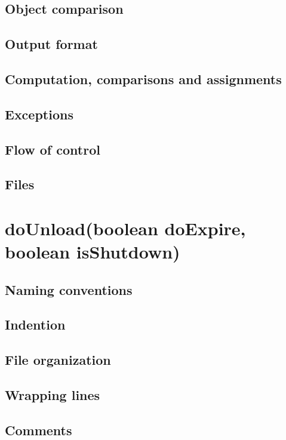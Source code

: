 \subsection*{Object comparison}

\subsection*{Output format}

\subsection*{Computation, comparisons and assignments}

\subsection*{Exceptions}

\subsection*{Flow of control}

\subsection*{Files}

\section*{doUnload(boolean doExpire, boolean isShutdown)}

\subsection*{Naming conventions}

\subsection*{Indention}

\subsection*{File organization}

\subsection*{Wrapping lines}

\subsection*{Comments}

